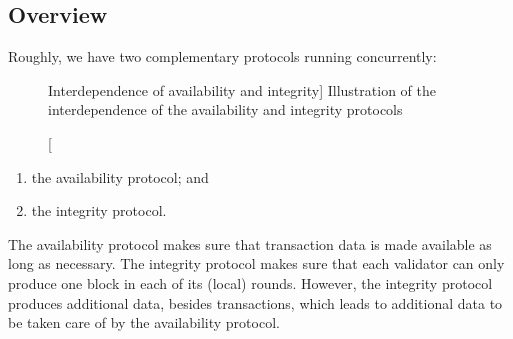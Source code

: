 \documentclass{article}
\theoremstyle{definition}
\newcommand{\DAG}[1][]{\textsc{dag}#1\xspace}
\begin{document}
\subsection{Overview}
Roughly, we have two complementary protocols running concurrently: 

\begin{figure}[htb]
  \centering
  
  \protect{}
  \caption%
  [Interdependence of availability and integrity]%
  {Illustration of the interdependence of the availability and integrity protocols}
  \label{fig:availability-n-integrity}
\end{figure}
 \begin{enumerate}
 \item the availability protocol; and
 \item the integrity protocol. 
 \end{enumerate}
 The availability protocol makes sure
 that transaction data is made available as long as necessary.
 The integrity protocol makes sure that 
 each validator can only produce one block in each of its (local) rounds. 
 However, %
 the integrity protocol produces additional data, %
 besides transactions, 
 which leads to additional data to be taken care of by the availability protocol.
\end{document}
